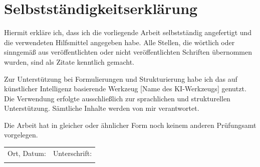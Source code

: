 \section*{Selbstständigkeitserklärung}
\thispagestyle{plain}

\noindent
Hiermit erkläre ich, dass ich die vorliegende Arbeit selbstständig angefertigt und die verwendeten Hilfsmittel angegeben habe. Alle Stellen, die wörtlich oder sinngemäß aus veröffentlichten oder nicht veröffentlichten Schriften übernommen wurden, sind als Zitate kenntlich gemacht.

\noindent
Zur Unterstützung bei Formulierungen und Strukturierung habe ich das auf künstlicher Intelligenz basierende Werkzeug [Name des KI-Werkzeugs] genutzt. Die Verwendung erfolgte ausschließlich zur sprachlichen und strukturellen Unterstützung. Sämtliche Inhalte werden von mir verantwortet.

\noindent
Die Arbeit hat in gleicher oder ähnlicher Form noch keinem anderen Prüfungsamt vorgelegen.

\vspace{4em}

\begin{tabular}{p{6cm} p{6cm}}
	Ort, Datum: & Unterschrift: \\[2.0em]
	\hrulefill & \hrulefill
\end{tabular}
